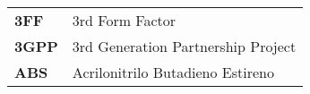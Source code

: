 
\renewcommand{\arraystretch}{1.5}



\begin{longtable}{l p{13.7cm}}
\textbf{3FF} & 3rd Form Factor  \\
\textbf{3GPP} & 3rd Generation Partnership Project  \\
\textbf{ABS} & Acrilonitrilo Butadieno Estireno  \\

\end{longtable}
